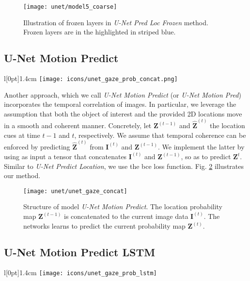 \begin{figure}[htbp]
  \centering
  \texttt{[image: unet/model5\_coarse]}
  \caption[Modified U-Net with freezed encoder part]{Illustration of frozen layers in \textit{U-Net Pred Loc Frozen} method. Frozen layers are in the highlighted in striped blue.}
  \label{fig:model_freeze}
\end{figure}

\subsection{U-Net Motion Predict} \label{sec:unet_pred_loc_concat}
\begingroup
\setlength\intextsep{0pt}
\begin{wrapfigure}[4]{l}[0pt]{1.4cm}
\texttt{[image: icons/unet\_gaze\_prob\_concat.png]}
\end{wrapfigure}

Another approach, which we call \textit{U-Net Motion Predict} (or \textit{U-Net Motion Pred}) incorporates the temporal correlation of images.
In particular, we leverage the assumption that both the object of interest and the provided 2D locations move in a smooth and coherent manner.
Concretely, let $\boldsymbol{Z}^{(t-1)}$ and $\boldsymbol{\hat{Z}}^{(t)}$ the location cues at time $t-1$ and $t$, respectively.
We assume that temporal coherence can be enforced by predicting $\boldsymbol{\hat{Z}}^{(t)}$ from $\boldsymbol{I}^{(t)}$ and $\boldsymbol{Z}^{(t-1)}$.
We implement the latter by using as input a tensor that concatenates $\boldsymbol{I}^{(t)}$ and $\boldsymbol{Z}^{(t-1)}$, so as to predict $\boldsymbol{Z}^{t}$.
Similar to \textit{U-Net Predict Location}, we use the \gls{bce} loss function.
Fig. \ref{fig:unet_gaze_concat} illustrates our method.

\begin{figure}[htbp]
  \centering
  \texttt{[image: unet/unet\_gaze\_concat]}
  \caption[U-Net Motion Predict]{Structure of model \textit{U-Net Motion Predict}.
    The location probability map $\boldsymbol{Z}^{(t-1)}$ is concatenated to the current image data $\boldsymbol{I}^{(t)}$.
    The networks learns to predict the current probability map $\boldsymbol{Z}^{(t)}$.}
  \label{fig:unet_gaze_concat}
\end{figure}

\subsection{U-Net Motion Predict LSTM} \label{ch:unet_gaze_prob_lstm}
\begingroup
\setlength\intextsep{0pt}
\begin{wrapfigure}[4]{l}[0pt]{1.4cm}
\texttt{[image: icons/unet\_gaze\_prob\_lstm]}
\end{wrapfigure}

